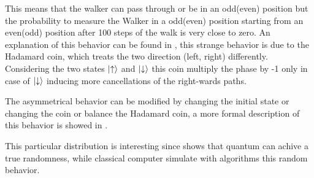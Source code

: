 This means that the walker can pass through or be in an odd(even) position but the probability to measure the Walker in a odd(even) position starting 
from an even(odd) position after 100 steps of the walk is very close to zero.  
An explanation of this behavior can be found in \cite{Kempe_2003}, this strange behavior is due to the Hadamard coin, which treats the two direction (left, right) differently. 
Considering the two states $\ket{\uparrow }$ and $\ket{\downarrow }$ this coin multiply the phase 
by -1 only in case of $\ket{\downarrow }$ inducing more cancellations of the right-wards paths.

The asymmetrical behavior can be modified by changing the initial state or 
changing the coin or balance the Hadamard coin, a more formal description of this behavior is showed in \cite{6812670}.

This particular distribution is interesting since shows that quantum can achive a true randomness, while classical computer simulate with algorithms this random behavior. 